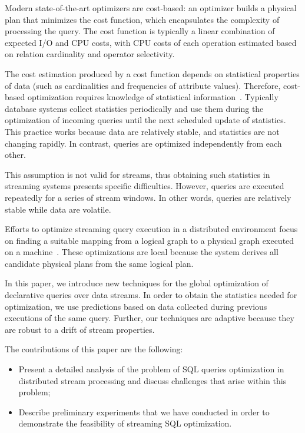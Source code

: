 Modern state-of-the-art optimizers are cost-based: an optimizer builds a physical plan that minimizes the cost function, which encapsulates the complexity of processing the query. 
The cost function is typically a linear combination of expected I/O and CPU costs, with CPU costs of each operation estimated based on relation cardinality and operator selectivity. 

The cost estimation produced by a cost function depends on statistical properties of data (such as cardinalities and frequencies of attribute values). Therefore, cost-based optimization requires knowledge of statistical information~\cite{Neumann2018optimization}.  
Typically database systems collect statistics periodically and use them during the optimization of incoming queries until the next scheduled update of statistics. 
This practice works because data are relatively stable, and statistics are not changing rapidly. In contrast, queries are optimized independently from each other. 

This assumption is not valid for streams, thus obtaining such statistics in streaming systems presents specific difficulties. However, queries are executed repeatedly for a series of stream windows. In other words, queries are relatively stable while data are volatile.

Efforts to optimize streaming query execution in a distributed environment focus on finding a suitable mapping from a logical graph to a physical graph executed on a machine~\cite{grulich2020grizzly, gedik2009code, kroll2019arc, schneider2012auto, gedik2008spade}.
These optimizations are local because the system derives all candidate physical plans from the same logical plan.  

In this paper, we introduce new techniques for the global optimization of declarative queries over data streams. 
In order to obtain the statistics needed for optimization, we use predictions based on data collected during previous executions of the same query. 
Further, our techniques are adaptive because they are robust to a drift of stream properties. 

The  contributions of this paper are the following:
\begin{itemize}
    \item Present a detailed analysis of the problem of SQL queries optimization in distributed stream processing and discuss challenges that arise within this problem;
    \item Describe preliminary experiments that we have conducted in order to demonstrate the feasibility of streaming SQL optimization.
\end{itemize}

